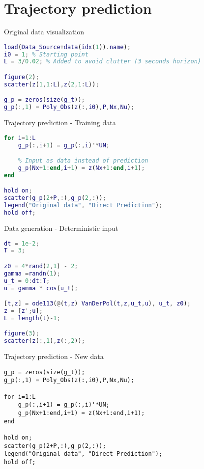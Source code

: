 \documentclass{beamer}
\begin{document}
\section{Trajectory prediction}

\begin{frame}[fragile]{Original data visualization}
    \begin{lstlisting}[language=Matlab]
load(Data_Source+data(idx(1)).name);
i0 = 1; % Starting point
L = 3/0.02; % Added to avoid clutter (3 seconds horizon)

figure(2);
scatter(z(1,1:L),z(2,1:L));

g_p = zeros(size(g_t));
g_p(:,1) = Poly_Obs(z(:,i0),P,Nx,Nu);
    \end{lstlisting}
\end{frame}

\begin{frame}[fragile]{Trajectory prediction - Training data}
    \begin{lstlisting}[language=Matlab]
for i=1:L
    g_p(:,i+1) = g_p(:,i)'*UN;

    % Input as data instead of prediction
    g_p(Nx+1:end,i+1) = z(Nx+1:end,i+1);
end

hold on;
scatter(g_p(2+P,:),g_p(2,:));
legend("Original data", "Direct Prediction");
hold off;
    \end{lstlisting}
\end{frame}

\begin{frame}[fragile]{Data generation - Deterministic input}
    \begin{lstlisting}[language=matlab]
dt = 1e-2;
T = 3;

z0 = 4*rand(2,1) - 2;
gamma =randn(1);
u_t = 0:dt:T;
u = gamma * cos(u_t);

[t,z] = ode113(@(t,z) VanDerPol(t,z,u_t,u), u_t, z0);
z = [z';u];
L = length(t)-1;

figure(3);
scatter(z(:,1),z(:,2));
    \end{lstlisting}
\end{frame}

\begin{frame}[fragile]{Trajectory prediction - New data}
    \begin{lstlisting}
g_p = zeros(size(g_t));
g_p(:,1) = Poly_Obs(z(:,i0),P,Nx,Nu);

for i=1:L
    g_p(:,i+1) = g_p(:,i)'*UN;
    g_p(Nx+1:end,i+1) = z(Nx+1:end,i+1);
end

hold on;
scatter(g_p(2+P,:),g_p(2,:));
legend("Original data", "Direct Prediction");
hold off;
    \end{lstlisting}
\end{frame}
\end{document}
